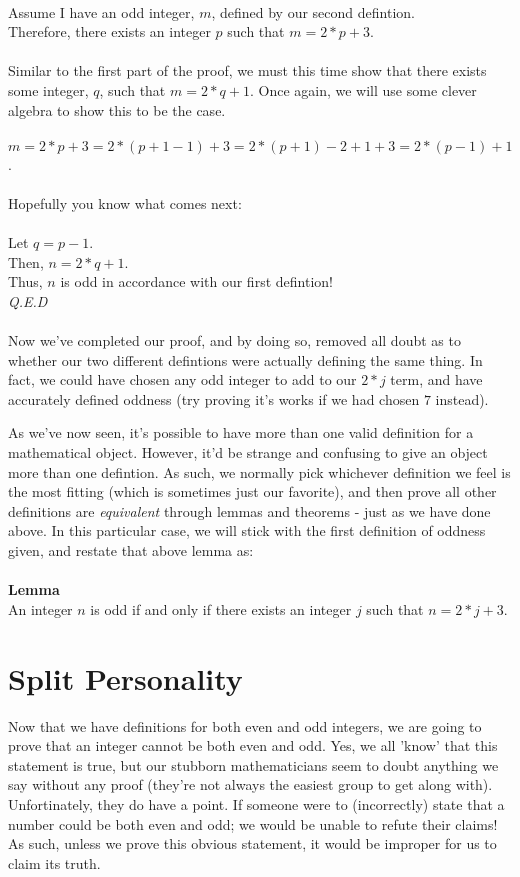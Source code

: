 \documentclass[a4paper,12pt]{article}
\begin{document}
\\
Assume I have an odd integer, $m$, defined by our second defintion.\\
Therefore, there exists an integer $p$ such that $m = 2*p + 3$.\\
\\
Similar to the first part of the proof, we must this time show that there exists some integer, $q$, such that $m = 2*q + 1$. Once again, we will use some clever algebra to show this to be the case.\\
\\
$m = 2*p + 3 = 2*(p + 1 - 1) + 3 = 2*(p + 1) - 2+1 + 3 = 2*(p - 1) + 1$.\\
\\
Hopefully you know what comes next:\\
\\
Let $q = p - 1$.\\
Then, $n = 2*q + 1$.\\
Thus, $n$ is odd in accordance with our first defintion!\\
\textit{Q.E.D}\\
\\
Now we've completed our proof, and by doing so, removed all doubt as to whether our two different defintions were actually defining the same thing. In fact, we could have chosen any odd integer to add to our $2*j$ term, and have accurately defined oddness (try proving it's works if we had chosen $7$ instead). 

As we've now seen, it's possible to have more than one valid definition for a mathematical object. However, it'd be strange and confusing to give an object more than one defintion. As such, we normally pick whichever definition we feel is the most fitting (which is sometimes just our favorite), and then prove all other definitions are \textit{equivalent} through lemmas and theorems - just as we have done above. In this particular case, we will stick with the first definition of oddness given, and restate that above lemma as:\\
\\
\textbf{Lemma}\\
An integer $n$ is odd if and only if there exists an integer $j$ such that $n = 2*j + 3$.   

\section{Split Personality}
Now that we have definitions for both even and odd integers, we are going to prove that an integer cannot be both even and odd. Yes, we all 'know' that this statement is true, but our stubborn mathematicians seem to doubt anything we say without any proof (they're not always the easiest group to get along with). Unfortinately, they do have a point. If someone were to (incorrectly) state that a number could be both even and odd; we would be unable to refute their claims! As such, unless we prove this obvious statement, it would be improper for us to claim its truth.
\end{document}
